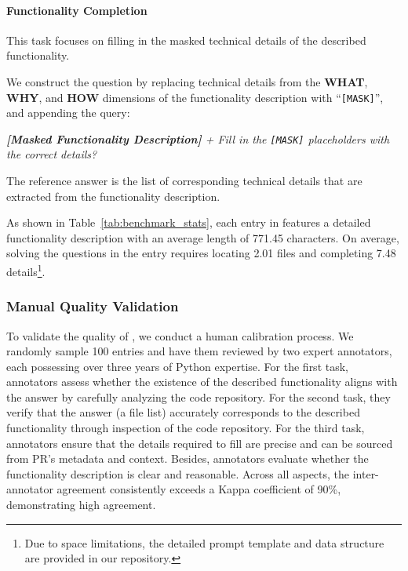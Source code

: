 \paragraph{\textbf{Functionality Completion}}
This task focuses on filling in the masked technical details of the described functionality.
\begin{description}[leftmargin=0pt, labelwidth=2em]
    \item[\textbf{$\blacktriangleleft$} \textbf{\textcolor{violet}{Question}}:] We construct the question by replacing technical details from the \textbf{WHAT}, \textbf{WHY}, and \textbf{HOW} dimensions of the functionality description with ``\texttt{[MASK]}'', and appending the query:

\begin{myfindbox}
    \small \textit{\textbf{[Masked Functionality Description]} + Fill in the \texttt{[MASK]} placeholders with the correct details?}
\end{myfindbox}
    \item [\textbf{$\blacktriangleright$} \textbf{\textcolor{orange}{Answer}}:] The reference answer is the list of corresponding technical details that are extracted from the functionality description.
\end{description}

As shown in Table~\ref{tab:benchmark_stats}, each entry in \benchmark features a detailed functionality description with an average length of 771.45 characters. On average, solving the questions in the entry requires locating 2.01 files and completing 7.48 details\footnote{Due to space limitations, the detailed prompt template and data structure are provided in our repository.}.

\subsubsection{Manual Quality Validation}
To validate the quality of \benchmark, we conduct a human calibration process. We randomly sample 100 entries and have them reviewed by two expert annotators, each possessing over three years of Python expertise. For the first task, annotators assess whether the existence of the described functionality aligns with the answer by carefully analyzing the code repository. For the second task, they verify that the answer (a file list) accurately corresponds to the described functionality through inspection of the code repository. For the third task, annotators ensure that the details required to fill are precise and can be sourced from PR's metadata and context. Besides, annotators evaluate whether the functionality description is clear and reasonable. Across all aspects, the inter-annotator agreement consistently exceeds a Kappa coefficient of 90\%, demonstrating high agreement.


